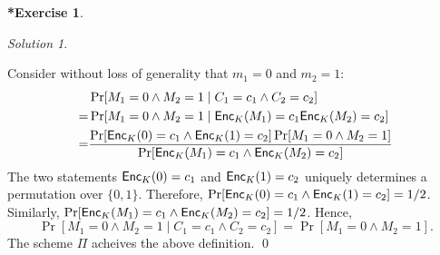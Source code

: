 \documentclass[titlepage,reqno]{amsart}
\theoremstyle{definition}
\newtheorem{exercise*}[exercise]{*Exercise}
\theoremstyle{remark}
\newtheorem*{solution}{Solution}
\begin{document}
\begin{exercise*}
\begin{solution}
\begin{enumerate}[leftmargin=*,label=(\alph*)]
            \noindent
            Consider without loss of generality that $m_1 = 0$ and $m_2 = 1$:
            \begin{align*}
                &\Pr[M_1 = 0 \wedge M_2 = 1 \mid C_1 = c_1 \wedge C_2 = c_2] \\
                = &\Pr[M_1 = 0 \wedge M_2 = 1 \mid \mathsf{Enc}_K(M_1)=c_1 \mathsf{Enc}_K(M_2) = c_2] \\
                = &\frac{\Pr[\mathsf{Enc}_K(0)=c_1 \wedge \mathsf{Enc}_K(1) = c_2] \Pr[M_1 = 0 \wedge M_2 = 1]}
                {\Pr[\mathsf{Enc}_K(M_1)=c_1 \wedge \mathsf{Enc}_K(M_2) = c_2]}
            \end{align*}
            The two statements $\mathsf{Enc}_K(0)=c_1$ and $\mathsf{Enc}_K(1) = c_2$ uniquely determines a permutation over $\{0,1\}$.
            Therefore, 
            $\Pr[\mathsf{Enc}_K(0)=c_1 \wedge \mathsf{Enc}_K(1) = c_2] = 1/2$.
            Similarly, $\Pr[\mathsf{Enc}_K(M_1)=c_1 \wedge \mathsf{Enc}_K(M_2) = c_2] = 1/2$.
            Hence, 
            \[
                \Pr[M_1 = 0 \wedge M_2 = 1 \mid C_1 = c_1 \wedge C_2 = c_2] = \Pr[M_1 = 0 \wedge M_2 = 1].
            \]
            The scheme $\Pi$ acheives the above definition.
            \qed
        \end{enumerate}
    \end{solution}
\end{exercise*}
\end{document}
